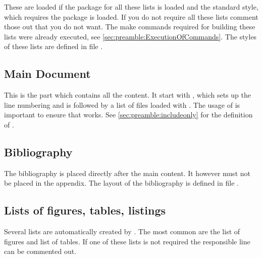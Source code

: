These are loaded if the package for all these lists is loaded and the standard 
style, which requires the  package is loaded. If you do 
not require all these lists comment those out that you do not want. The make 
commands required for building these lists were already executed, see 
\vref{sec:preamble:ExecutionOfCommands}. The styles of these lists are defined in file .

\subsection{Main Document}
\label{sec:document:content}

This is the part which contains all the content. It start with , which sets up the line numbering and is followed by a list of files loaded with . The usage of  is important to ensure that  works. See \cref{sec:preamble:includeonly} for the definition of .


\subsection{Bibliography}
\label{sec:document:bibliography}

The bibliography is placed directly after the main content. It however must 
not be placed in the appendix. The layout of the bibliography is defined in 
file .
%

\subsection{Lists of figures, tables, listings}
\label{sec:document:lists}

Several lists are automatically created by \latex. The most common are the list of figures and list of tables. If one of these lists is not required the responsible line can be commented out. 
%

